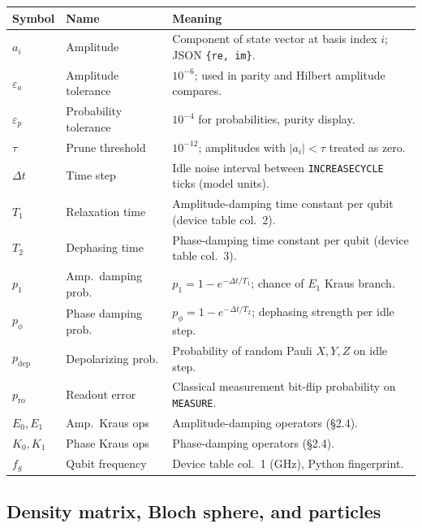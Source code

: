 \documentclass[11pt,a4paper]{article}
\begin{document}
\begin{center}
\small
\begin{tabular}{@{}p{2.2cm}p{4.2cm}p{7.5cm}@{}}
\toprule
Symbol & Name & Meaning \\
\midrule
$a_i$ & Amplitude & Component of state vector at basis index $i$; JSON \texttt{\{re, im\}}. \\
$\varepsilon_a$ & Amplitude tolerance & $10^{-6}$; used in parity and Hilbert amplitude compares. \\
$\varepsilon_p$ & Probability tolerance & $10^{-4}$ for probabilities, purity display. \\
$\tau$ & Prune threshold & $10^{-12}$; amplitudes with $|a_i|<\tau$ treated as zero. \\
$\Delta t$ & Time step & Idle noise interval between \texttt{INCREASECYCLE} ticks (model units). \\
$T_1$ & Relaxation time & Amplitude-damping time constant per qubit (device table col.\ 2). \\
$T_2$ & Dephasing time & Phase-damping time constant per qubit (device table col.\ 3). \\
$p_1$ & Amp.\ damping prob. & $p_1 = 1 - e^{-\Delta t/T_1}$; chance of $E_1$ Kraus branch. \\
$p_\phi$ & Phase damping prob. & $p_\phi = 1 - e^{-\Delta t/T_2}$; dephasing strength per idle step. \\
$p_{\mathrm{dep}}$ & Depolarizing prob. & Probability of random Pauli $X,Y,Z$ on idle step. \\
$p_{\mathrm{ro}}$ & Readout error & Classical measurement bit-flip probability on \texttt{MEASURE}. \\
$E_0,E_1$ & Amp.\ Kraus ops & Amplitude-damping operators (\S2.4). \\
$K_0,K_1$ & Phase Kraus ops & Phase-damping operators (\S2.4). \\
$f_g$ & Qubit frequency & Device table col.\ 1 (GHz), Python fingerprint. \\
\bottomrule
\end{tabular}
\end{center}

\subsection{Density matrix, Bloch sphere, and particles}
\end{document}
